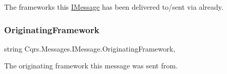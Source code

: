 The frameworks this \hyperlink{interfaceCqrs_1_1Messages_1_1IMessage}{I\+Message} has been delivered to/sent via already. 

\mbox{\label{interfaceCqrs_1_1Messages_1_1IMessage_aff9a2d35971384fb440954c3163eaeef_aff9a2d35971384fb440954c3163eaeef}} 
\subsubsection{\texorpdfstring{Originating\+Framework}{OriginatingFramework}}
{\footnotesize\ttfamily string Cqrs.\+Messages.\+I\+Message.\+Originating\+Framework\hspace{0.3cm}{\ttfamily [get]}, {\ttfamily [set]}}



The originating framework this message was sent from. 

